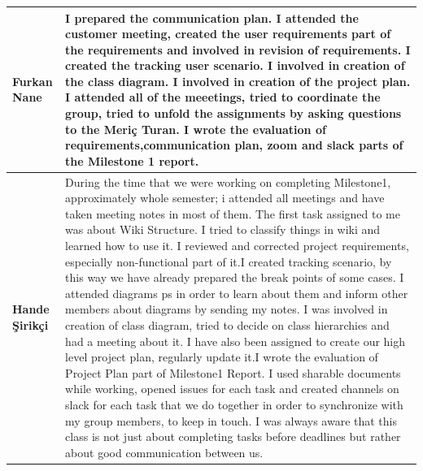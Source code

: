 \documentclass[]{article}
\begin{document}
\begin{table}[H]
{\begin{tabulary}{1.3\textwidth}{LL}
            \textbf{Furkan Nane}       & I prepared the communication plan. I attended the customer meeting, created the user requirements part of the requirements and involved in revision of requirements. I created the tracking user scenario. I involved in creation of the class diagram. I involved in creation of the project plan. I attended all of the meeetings, tried to coordinate the group, tried to unfold the assignments by asking questions to the Meriç Turan. I wrote the evaluation of requirements,communication plan, zoom and slack parts of the Milestone 1 report.                                                                                                                                                                                                                                                                                                                                                                                                                                                                                                                                                                                                                                                                                                                                                                                                                                                                                                                                                                                                                                                                 \\ \midrule
            \textbf{Hande Şirikçi}         & During the time that we were working on completing Milestone1, approximately whole semester; i attended all meetings and have taken meeting notes in most of them. The first task assigned to me was about Wiki Structure. I tried to classify things in wiki and learned how to use it. I reviewed and corrected project requirements, especially non-functional part of it.I created tracking scenario, by this way we have already prepared the break points of some cases. I attended diagrams ps in order to learn about them and inform other members about diagrams by sending my notes. I was involved in creation of class diagram, tried to decide on class hierarchies and had a meeting about it. I have also been assigned to create our high level project plan, regularly update it.I wrote the evaluation of Project Plan part of Milestone1 Report. I used sharable documents while working, opened issues for each task and created channels on slack for each task that we do together in order to synchronize with my group members, to keep in touch. I was always aware that this class is not just about completing tasks before deadlines but rather about good communication between us.                                                                                                                                                                                                                                                                                                                                                                                                      \\ \midrule

\end{tabulary}}
\end{table}
\end{document}
